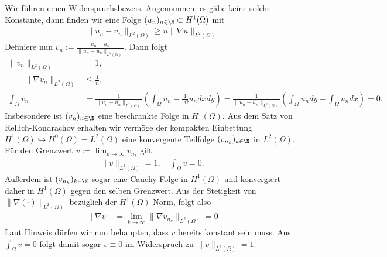 \begin{solution}

Wir führen einen Widerspruchsbeweis. Angenommen, es gäbe keine solche Konstante,
dann finden wir eine Folge $(u_n)_{n \in \N} \subset H^1(\Omega)$ mit
\begin{align*}
  \|u_n - \overline{u_n}\|_{L^2(\Omega)} \geq n\|\nabla u\|_{L^2(\Omega)}
\end{align*}
Definiere nun $v_n := \frac{u_n - \overline{u_n}}{\|u_n - \overline{u_n}\|_{L^2(\Omega)}}$.
Dann folgt
\begin{align*}
  \|v_n\|_{L^2(\Omega)} &= 1, \\
  \qquad \|\nabla v_n\|_{L^2(\Omega)} &\leq \frac{1}{n}, \\
  \int_\Omega v_n &= \frac{1}{\|u_n -\overline{u_n}\|_{L^2(\Omega)}}
  \left(\int_{\Omega}u_n - \frac{1}{|\Omega}u_n dx dy\right)
  = \frac{1}{\|u_n -\overline{u_n}\|_{L^2(\Omega)}}
  \left(\int_{\Omega}u_n dy - \int_\Omega u_n dx\right) = 0.
\end{align*}
Insbesondere ist $(v_n)_{n \in \N}$ eine beschränkte Folge in $H^1(\Omega)$.
Aus dem Satz von Rellich-Kondrachov erhalten wir vermöge der kompakten Einbettung
$H^1(\Omega) \hookrightarrow H^0(\Omega) = L^2(\Omega)$ eine konvergente Teilfolge
$(v_{n_k})_{k\in \N}$ in $L^2(\Omega)$. Für den Grenzwert $v := \lim_{k \to \infty} v_{n_k}$ gilt
\begin{align*}
  \|v\|_{L^2(\Omega)} = 1, \quad \int_\Omega v = 0.
\end{align*}
Außerdem ist $(v_{n_k})_{k \in \N}$ sogar eine Cauchy-Folge in $H^1(\Omega)$
und konvergiert daher in $H^1(\Omega)$ gegen den selben Grenzwert.
Aus der Stetigkeit von $\|\nabla(\cdot)\|_{L^2(\Omega)}$ bezüglich der $H^1(\Omega)$-Norm,
folgt also
\begin{align*}
  \|\nabla v\| = \lim_{k \to \infty}\|\nabla v_{n_k}\|_{L^2(\Omega)} = 0
\end{align*}
Laut Hinweis dürfen wir nun behaupten, dass $v$ bereits konstant sein muss.
Aus $\int_\Omega v = 0$ folgt damit sogar $v \equiv 0$ im Widerspruch zu $\|v\|_{L^2(\Omega)} = 1$.
\end{solution}

